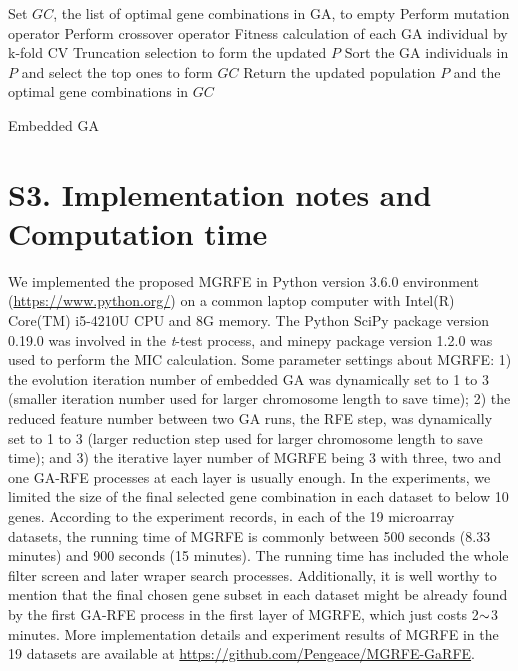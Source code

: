 \documentclass[10pt,journal,compsoc]{IEEEtran}
\begin{document}
	\begin{algorithm}
		\text{}
		Set $GC$, the list of optimal gene combinations in GA, to empty\;
		{
			Perform mutation operator\;
			Perform crossover operator\;
			Fitness calculation of each GA individual by k-fold CV\;
			Truncation selection to form the updated $P$\;
		}
		Sort the GA individuals in $P$ and select the top ones to form $GC$\;
		Return the updated population $P$ and the optimal gene combinations in $GC$\;
		\caption{Embedded GA}\label{Algo:GA}
	\end{algorithm}
	
	
	\section*{S3. Implementation notes and Computation time}

	We implemented the proposed MGRFE in Python version 3.6.0 environment (\url{https://www.python.org/}) on a common laptop computer with Intel(R) Core(TM) i5-4210U CPU and 8G memory. The Python SciPy package version 0.19.0 \cite{RN441} was involved in the \textit{t}-test process, and minepy package version 1.2.0 \cite{RN440} was used to perform the MIC calculation. Some parameter settings about MGRFE: 1) the evolution iteration number of embedded GA was dynamically set to 1 to 3 (smaller iteration number used for larger chromosome length to save time); 2) the reduced feature number between two GA runs, the RFE step, was dynamically set to 1 to 3 (larger reduction step used for larger chromosome length to save time); and 3) the iterative layer number of MGRFE being 3 with three, two and one GA-RFE processes at each layer is usually enough. In the experiments, we limited the size of the final selected gene combination in each dataset to below 10 genes. According to the experiment records, in each of the 19 microarray datasets, the running time of MGRFE is commonly between 500 seconds (8.33 minutes) and 900 seconds (15 minutes). The running time has included the whole filter screen and later wraper search processes. Additionally, it is well worthy to mention that the final chosen gene subset in each dataset might be already found by the first GA-RFE process in the first layer of MGRFE, which just costs 2\(\scriptsize{\sim}\)3 minutes. More implementation details and experiment results of MGRFE in the 19 datasets are available at \url{https://github.com/Pengeace/MGRFE-GaRFE}.
	
\end{document}
